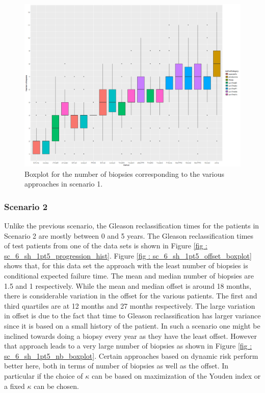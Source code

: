 \begin{figure}[H]
\centering
\captionsetup{justification=centering}
\includegraphics[width=\textwidth]{sim_study_res_sc_10_sh_7pt5/nb_boxplot.png}
\caption{\label{fig : sc_10_sh_7pt5_nb_boxplot} Boxplot for the number of biopsies corresponding to the various approaches in scenario 1.}
\end{figure}

\subsubsection{Scenario 2}
Unlike the previous scenario, the Gleason reclassification times for the patients in Scenario 2 are mostly between 0 and 5 years. The Gleason reclassification times of test patients from one of the data sets is shown in Figure \ref{fig : sc_6_sh_1pt5_progression_hist}. Figure \ref{fig : sc_6_sh_1pt5_offset_boxplot} shows that, for this data set the approach with the least number of biopsies is conditional expected failure time. The mean and median number of biopsies are 1.5 and 1 respectively. While the mean and median offset is around 18 months, there is considerable variation in the offset for the various patients. The first and third quartiles are at 12 months and 27 months respectively. The large variation in offset is due to the fact that time to Gleason reclassification has larger variance since it is based on a small history of the patient. In such a scenario one might be inclined towards doing a biopsy every year as they have the least offset. However that approach leads to a very large number of biopsies as shown in Figure \ref{fig : sc_6_sh_1pt5_nb_boxplot}. Certain approaches based on dynamic risk perform better here, both in terms of number of biopsies as well as the offset. In particular if the choice of $\kappa$ can be based on maximization of the Youden index or a fixed $\kappa$ can be chosen.

